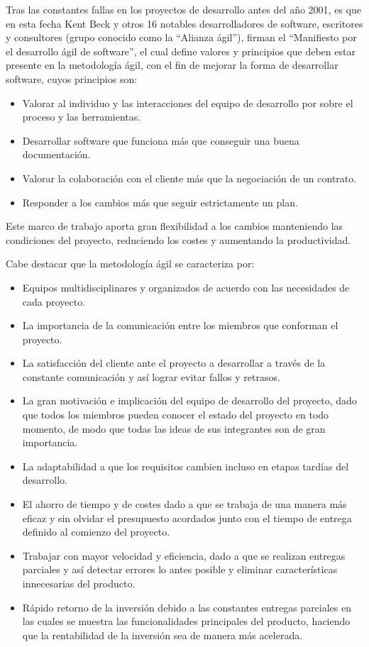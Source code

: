 Tras las constantes fallas en los proyectos de desarrollo antes del año 2001, es que en esta fecha Kent Beck y otros 16 notables desarrolladores de software, escritores y consultores (grupo conocido como la ``Alianza ágil''), firman el ``Manifiesto por el desarrollo ágil de software'', el cual define valores y principios que deben estar presente en la metodología ágil, con el fin de mejorar la forma de desarrollar software, cuyos principios son:

\begin{itemize}
    \item Valorar al individuo y las interacciones del equipo de desarrollo por sobre el proceso y las herramientas.
    \item Desarrollar software que funciona más que conseguir una buena documentación.
    \item Valorar la colaboración con el cliente más que la negociación de un contrato.
    \item Responder a los cambios más que seguir estrictamente un plan.
\end{itemize}

Este marco de trabajo aporta gran flexibilidad a los cambios manteniendo las condiciones del proyecto, reduciendo los costes y aumentando la productividad.

Cabe destacar que la metodología ágil se caracteriza por:

\begin{itemize}
    \item Equipos multidisciplinares y organizados de acuerdo con las necesidades de cada proyecto.
    \item La importancia de la comunicación entre los miembros que conforman el proyecto.
    \item La satisfacción del cliente ante el proyecto a desarrollar a través de la constante comunicación y así lograr evitar fallos y retrasos.
    \item La gran motivación e implicación del equipo de desarrollo del proyecto, dado que todos los miembros pueden conocer el estado del proyecto en todo momento, de modo que todas las ideas de sus integrantes son de gran importancia.
    \item La adaptabilidad a que los requisitos cambien incluso en etapas tardías del desarrollo.
    \item El ahorro de tiempo y de costes dado a que se trabaja de una manera más eficaz y sin olvidar el presupuesto acordados junto con el tiempo de entrega definido al comienzo del proyecto.
    \item Trabajar con mayor velocidad y eficiencia, dado a que se realizan entregas parciales y así detectar errores lo antes posible y eliminar características innecesarias del producto.
    \item Rápido retorno de la inversión debido a las constantes entregas parciales en las cuales se muestra las funcionalidades principales del producto, haciendo que la rentabilidad de la inversión sea de manera más acelerada.
\end{itemize}

